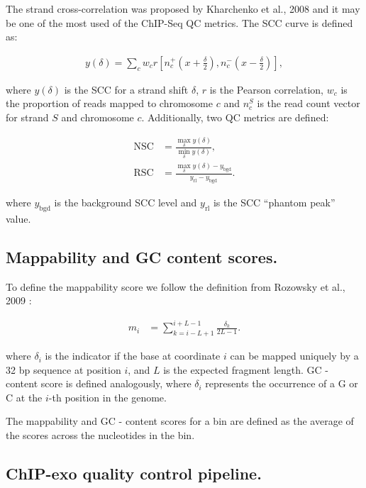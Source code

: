 \documentclass{bmcart}\usepackage[]{graphicx}\usepackage[]{color}
\begin{document}
The strand cross-correlation was proposed by Kharchenko et al., 2008
\cite{strandcc} and it may be one of the most used of the ChIP-Seq QC
metrics. The SCC curve is defined as:

\begin{align}
  y(\delta) = \sum_c w_c r\left[ n_c^+ \left(x + \frac{\delta}{2}
    \right), n_c^- \left( x- \frac{\delta}{2} \right)\right],
\label{scc}
\end{align}

where $y(\delta)$ is the SCC for a strand shift $\delta$, $r$ is the
Pearson correlation, $w_c$ is the proportion of reads mapped to
chromosome $c$ and $n_c^S$ is the read count vector for strand $S$ and
chromosome $c$. Additionally, two QC metrics are defined:

\begin{align}
  \mbox{NSC} &= \frac{\max_\delta y(\delta)}{\min_\delta y(\delta)}, \label{nsc} \\
  \mbox{RSC} &= \frac{\max_\delta y(\delta) -
    y_{\text{bgd}}}{y_{\text{rl}} - y_{\text{bgd}}}. \label{rsc}
\end{align}

where $y_{\text{bgd}}$ is the background SCC level and $y_{\text{rl}}$
is the SCC ``phantom peak'' value.

\subsection*{Mappability and GC content scores.}

To define the mappability score we follow the definition from Rozowsky
et al., 2009 \cite{peakseq}:

\begin{align}
  m_i &= \sum_{k = i - L +1}^{i + L - 1} \frac{\delta_k }{2L - 1}.
\end{align}

where $\delta_i$ is the indicator if the base at coordinate $i$ can be
mapped uniquely by a 32 bp sequence at position $i$, and $L$ is the
expected fragment length. GC - content score is defined analogously,
where $\delta_i$ represents the occurrence of a G or C at the $i$-th
position in the genome. 

The mappability and GC - content scores for a bin are defined as the
average of the scores across the nucleotides in the bin.

\subsection*{ChIP-exo quality control pipeline.}
\end{document}
